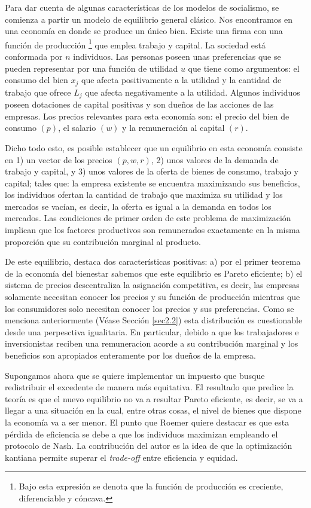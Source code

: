 Para dar cuenta de algunas características de los modelos de socialismo, se comienza a partir un modelo de equilibrio general clásico. Nos encontramos en una economía en donde se produce un único bien. Existe una firma con una función de producción \footnote{Bajo esta expresión se denota que la función de producción es creciente, diferenciable y cóncava.} que emplea trabajo y capital. La sociedad está conformada por $n$ individuos. Las personas poseen unas preferencias que se pueden representar por una función de utilidad $u$ que tiene como argumentos: el consumo del bien $x_j$ que afecta positivamente a la utilidad y la cantidad de trabajo que ofrece $L_j$ que afecta negativamente a la utilidad. Algunos individuos poseen dotaciones de capital positivas y son dueños de las acciones de las empresas. Los precios relevantes para esta economía son: el precio del bien de consumo $(p)$, el salario $(w)$ y la remuneración al capital $(r)$. 

Dicho todo esto, es posible establecer que un equilibrio en esta economía consiste en 1) un vector de los precios $(p,w,r)$, 2) unos valores de la demanda de trabajo y capital, y 3) unos valores de la oferta de bienes de consumo, trabajo y capital; tales que: la empresa existente se encuentra maximizando sus beneficios, los individuos ofertan la cantidad de trabajo que maximiza su utilidad y los mercados se vacían, es decir, la oferta es igual a la demanda en todos los mercados. Las condiciones de primer orden de este problema de maximización implican que los factores productivos son remunerados exactamente en la misma proporción que su contribución marginal al producto.

De este equilibrio, \citet{Roemer_2021a} destaca dos características positivas: a) por el primer teorema de la economía del bienestar sabemos que este equilibrio es Pareto eficiente; b) el sistema de precios descentraliza la asignación competitiva, es decir, las empresas solamente necesitan conocer los precios y su función de producción mientras que los consumidores solo necesitan conocer los precios y sus preferencias. Como se menciona anteriormente (Véase Sección \ref{sec2.2}) esta distribución es cuestionable desde una perpesctiva igualitaria. En particular, debido a  que los trabajadores e inversionistas reciben una remuneracion acorde a su contribución marginal y los beneficios son apropiados enteramente por los dueños de la empresa.

Supongamos ahora que se quiere implementar un impuesto que busque redistribuir el excedente de manera más equitativa. El resultado que predice la teoría es que el nuevo equilibrio no va a resultar Pareto eficiente, es decir, se va a llegar a una situación en la cual, entre otras cosas, el nivel de bienes que dispone la economía va a ser menor. El punto que Roemer quiere destacar es que esta pérdida de eficiencia se debe a que los individuos maximizan empleando el protocolo de Nash. La contribución del autor es la idea de que la optimización kantiana permite superar el \textit{trade-off} entre eficiencia y equidad.

